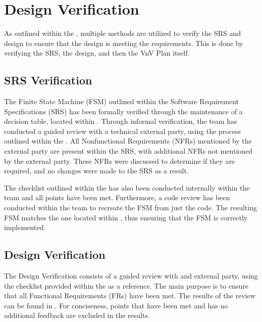 \documentclass[12pt, titlepage]{article}
\begin{document}

\newpage

\tableofcontents

\listoftables %

\listoffigures %

\newpage


\section{Design Verification}
\label{sec:designVerification}
As outlined within the , multiple methods are utilized to verify the SRS and design to ensure that the design is meeting the requirements. This is done by verifying the SRS, the design, and then the VnV Plan itself.

\subsection{SRS Verification}
\label{subsec:srsVerification}
The Finite State Machine (FSM) outlined within the Software Requirement Specifications (SRS) has been formally verified through the maintenance of a decision table, located within . Through informal verification, the team has conducted a guided review with a technical external party, using the process outlined within the . All Nonfunctional Requirements (NFRs) mentioned by the external party are present within the SRS, with additional NFRs not mentioned by the external party. These NFRs were discussed to determine if they are required, and no changes were made to the SRS as a result. 

The checklist outlined within the  has also been conducted internally within the team and all points have been met. Furthermore, a code review has been conducted within the team to recreate the FSM from just the code. The resulting FSM matches the one located within , thus ensuring that the FSM is correctly implemented.

\subsection{Design Verification}
\label{subsec:designVerification}
The Design Verification consists of a guided review with and external party, using the checklist provided within the  as a reference. The main purpose is to ensure that all Functional Requirements (FRs) have been met. The results of the review can be found in . For conciseness, points that have been met and has no additional feedback are excluded in the results.
\end{document}
